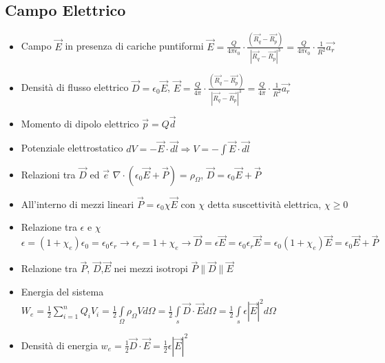 \documentclass{article}
\begin{document}
\subsection{Campo Elettrico}
\begin{itemize}
	\item Campo \(\vec{E}\) in presenza di cariche puntiformi \( \vec{E} = \frac{Q}{4 \pi \epsilon_0} \cdot \frac{(\vec{R_q} - \vec{R_p})}{| \vec{R_q} - \vec{R_p} | ^3 } = \frac{Q}{4 \pi \epsilon_0} \cdot \frac{1}{R^2} \vec{a_r} \)
	\item Densità di flusso elettrico \( \vec{D} = \epsilon_0 \vec{E} \),  \( \vec{E} = \frac{Q}{4 \pi} \cdot \frac{(\vec{R_q} - \vec{R_p})}{| \vec{R_q} - \vec{R_p} | ^3 } = \frac{Q}{4 \pi} \cdot \frac{1}{R^2} \vec{a_r} \)
	\item Momento di dipolo elettrico \( \vec{p} = Q \vec{d} \)
	\item Potenziale elettrostatico \(dV = -\vec{E} \cdot \vec{dl} \Rightarrow V = -\int{\vec{E} \cdot \vec{dl}} \)
	\item Relazioni tra \(\vec{D}\) ed \(\vec{e}\) \( \nabla \cdot (\epsilon_0 \vec{E} + \vec{P} ) = \rho_\Omega \), \( \vec{D} = \epsilon_0 \vec{E} + \vec{P} \)
	\item All'interno di mezzi lineari \(\vec{P} = \epsilon_0 \chi \vec{E} \) con \(\chi\) detta suscettività elettrica, \(\chi \geq  0\)
	\item Relazione tra \(\epsilon\) e \(\chi\) \(\epsilon = (1 + \chi_e) \epsilon_0 = \epsilon_0 \epsilon_r \rightarrow \epsilon_r = 1 + \chi_e \rightarrow \vec{D} = \epsilon \vec{E} = \epsilon_0 \epsilon_r \vec{E} = \epsilon_0 (1 + \chi_e) \vec{E} = \epsilon_0 \vec{E} + \vec{P} \)
	\item Relazione tra \(\vec{P}\), \(\vec{D}\),\(\vec{E}\) nei mezzi isotropi \(\vec{P}\|\vec{D}\|\vec{E}\)
	\item Energia del sistema \( W_e = \frac{1}{2} \sum\limits_{i=1}^{n}Q_iV_i = \frac{1}{2} \int\limits_\Omega \rho_\Omega V d\Omega = \frac{1}{2} \int\limits_{s} \vec{D} \cdot \vec{E} d\Omega = \frac{1}{2} \int\limits_{s} \epsilon |\vec{E}|^2 d\Omega \)
	\item Densità di energia \( w_e = \frac{1}{2} \vec{D} \cdot \vec{E} = \frac{1}{2} \epsilon |\vec{E}|^2 \)
\end{itemize}
\end{document}
